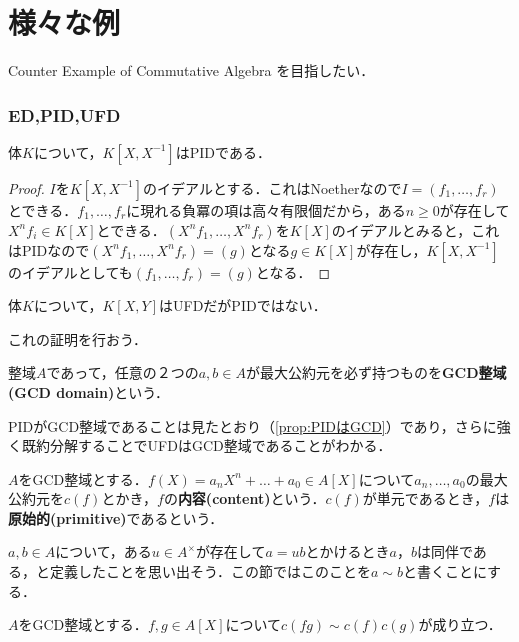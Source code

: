 \part[Appendix \thepart, Various Example]{様々な例}

Counter Example of Commutative Algebra を目指したい．

\section{ED,PID,UFD}
\begin{surex}
	体$K$について，$K[X,X^{-1}]$はPIDである．
\end{surex}

\begin{proof}
	$I$を$K[X,X^{-1}]$のイデアルとする．これはNoetherなので$I=(f_1,\dots,f_r)$とできる．$f_1,\dots,f_r$に現れる負冪の項は高々有限個だから，ある$n\geq0$が存在して$X^nf_i\in K[X]$とできる．$(X^nf_1,\dots,X^nf_r)$を$K[X]$のイデアルとみると，これはPIDなので$(X^nf_1,\dots,X^nf_r)=(g)$となる$g\in K[X]$が存在し，$K[X,X^{-1}]$のイデアルとしても$(f_1,\dots,f_r)=(g)$となる．
\end{proof}
\begin{surex}[UFDだがPIDでない環]
	体$K$について，$K[X,Y]$はUFDだがPIDではない．
\end{surex}

これの証明を行おう．
\begin{defi}[GCD整域]\label{defi:GCDdomain}
	整域$A$であって，任意の２つの$a,b\in A$が最大公約元を必ず持つものを\textbf{GCD整域(GCD domain)}という．
\end{defi}

PIDがGCD整域であることは見たとおり（\ref{prop:PIDはGCD}）であり，さらに強く既約分解することでUFDはGCD整域であることがわかる．

\begin{defi}[内容，原始多項式]
	$A$をGCD整域とする．$f(X)=a_nX^n+\dots+a_0\in A[X]$について$a_n,\dots,a_0$の最大公約元を$c(f)$とかき，$f$の\textbf{内容(content)}という．$c(f)$が単元であるとき，$f$は\textbf{原始的(primitive)}であるという．
\end{defi}

$a,b\in A$について，ある$u\in A^\times$が存在して$a=ub$とかけるとき$a，b$は同伴である，と定義したことを思い出そう．この節ではこのことを$a\sim b$と書くことにする．
\begin{lem}[Gaussの補題]
	$A$をGCD整域とする．$f,g\in A[X]$について$c(fg)\sim c(f)c(g)$が成り立つ．
\end{lem}

